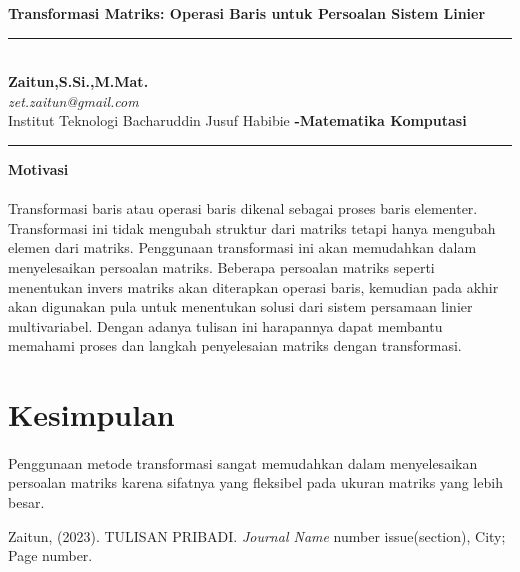 \documentclass{article}   %
\newcommand{\judul}{Transformasi Matriks: Operasi Baris untuk Persoalan Sistem Linier}
\newcommand{\topik}{Matematika Komputasi}
\begin{document}
	
\begin{center}
    \vspace{.4cm}
    \textsf{\textbf { \large \judul}}
\end{center}
\vspace{.4cm}
\hrule
    \textsf{\\
    \textbf{Zaitun,S.Si.,M.Mat.} \hspace{\fill}
    \textit{\large }\\ [0.7ex]
    \textit{zet.zaitun@gmail.com} \hspace{\fill} \textbf{}\\ [0.7ex]
    Institut Teknologi Bacharuddin Jusuf Habibie \hspace{\fill} \textbf{-\topik}} \\
\hrule
\vspace{.4cm}
\begin{center}
\textbf{\Large Motivasi}
\end{center}
\paragraph*{} 
Transformasi baris atau operasi baris dikenal sebagai proses baris elementer. Transformasi ini tidak mengubah struktur dari matriks tetapi hanya mengubah elemen dari matriks. Penggunaan transformasi ini akan memudahkan dalam menyelesaikan persoalan matriks. Beberapa persoalan matriks seperti menentukan invers matriks akan diterapkan operasi baris, kemudian pada akhir akan digunakan pula untuk menentukan solusi dari sistem persamaan linier multivariabel. Dengan adanya tulisan ini harapannya dapat membantu memahami proses dan langkah penyelesaian matriks dengan transformasi.




\section{Kesimpulan}
\paragraph*{} Penggunaan metode transformasi sangat memudahkan dalam menyelesaikan persoalan matriks karena sifatnya yang fleksibel pada ukuran matriks yang lebih besar. 



\begin{thebibliography}{2}
\bibitem{}Zaitun,				                   %
	\newblock  (2023).					       %
	\newblock TULISAN PRIBADI.			       %
	\newblock \emph{Journal Name} number issue(section),  %
	\newblock City;										  %
	\newblock Page number.								  %
\end{thebibliography}
\end{document}
